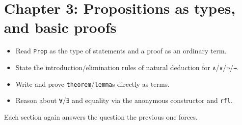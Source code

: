 \chapter{Chapter 3: Propositions as types, and basic proofs}\label{sec:03-propositions-and-proofs:00-index:1}

\begin{learningobjectives}
\begin{itemize}
\tightlist
\item
  Read \texttt{Prop} as the type of statements and a proof as an ordinary term.
\item
  State the introduction/elimination rules of natural deduction for \texttt{∧}/\texttt{∨}/\texttt{¬}/\texttt{→}.
\item
  Write and prove \texttt{theorem}/\texttt{lemma}s directly as terms.
\item
  Reason about \texttt{∀}/\texttt{∃} and equality via the anonymous constructor and \texttt{rfl}.
\end{itemize}
\end{learningobjectives}


Each section again answers the question the previous one forces.

